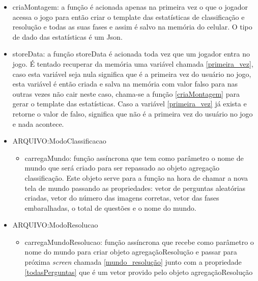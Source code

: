 \begin{itemize}
\begin{itemize}
	\item criaMontagem: a função é acionada apenas na primeira vez o que o jogador acessa o jogo para então criar o template das estatísticas de classificação e resolução e todas as suas fases e assim é salvo na memória do celular. O tipo de dado das estatísticas é um Json.

	\item storeData: a função storeData é acionada toda vez que um jogador entra no jogo. É tentado recuperar da memória uma variável chamada \ref{primeira_vez}, caso esta variável seja nula significa que é a primeira vez do usuário no jogo, esta variável é então criada e salva na memória com valor falso para nas outras vezes não cair neste caso, chama-se a função \ref{criaMontagem} para gerar o template das estatísticas. Caso a variável \ref{primeira_vez} já exista e retorne o valor de falso, significa que não é a primeira vez do usuário no jogo e nada acontece.

	\end{itemize}
\end{itemize}

\begin{itemize}
\item ARQUIVO:ModoClassificacao
	\begin{itemize}
	\item carregaMundo: função assíncrona que tem como parâmetro o nome de mundo que será criado para ser repassado ao objeto agregação classificação. Este objeto serve para a função na hora de chamar a nova tela de mundo passando as propriedades: vetor de perguntas aleatórias criadas, vetor do número das imagens corretas, vetor das fases embaralhadas, o total de questões e o nome do mundo.
	\end{itemize}
\end{itemize}

\begin{itemize}
\item ARQUIVO:ModoResolucao
	\begin{itemize}	
	\item carregaMundoResolucao: função assíncrona que recebe como parâmetro o nome do mundo para criar objeto agregaçãoResolução e passar para próxima \textit{screen} chamada \ref{mundo_resolução} junto com a propriedade \ref{todasPerguntas} que é um vetor provido pelo objeto agregaçãoResolução
	\end{itemize}	
\end{itemize}	


